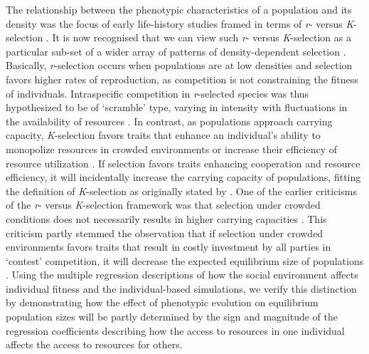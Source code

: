 \documentclass{article}
\begin{document}
The relationship between the phenotypic characteristics of a population and its density was the focus of early life-history studies framed in terms of \textit{r}- versus \textit{K}-selection \citep{macarthur1967theory}. It is now recognised that we can view such \textit{r}- versus \textit{K}-selection as a particular sub-set of a wider array of patterns of density-dependent selection \citep{Boyce1984, Wright2018, Engen2020}. Basically, \textit{r}-selection occurs when populations are at low densities and selection favors higher rates of reproduction, as competition is not constraining the fitness of individuals. Intraspecific competition in \textit{r}-selected species was thus hypothesized to be of 
`scramble' type, varying in intensity with fluctuations in the availability of resources \citep{Southwood1977}. In contrast, as populations approach carrying capacity, \textit{K}-selection favors traits that enhance an individual's ability to monopolize resources in crowded environments or increase their efficiency of resource utilization \citep{Boyce1984}. If selection favors traits enhancing cooperation and resource efficiency, it will incidentally increase the carrying capacity of populations, fitting the definition of \textit{K}-selection as originally stated by \cite{macarthur1967theory}. One of the earlier criticisms of the \textit{r}- versus \textit{K}-selection framework was that selection under crowded conditions does not necessarily results in higher carrying capacities \citep{Boyce1984}. This criticism partly stemmed the observation that if selection under crowded environments favors traits that result in costly investment by all parties in 
`contest' competition, it will decrease the expected equilibrium size of populations \citep{Joshi2001, Engen2020}. Using the multiple regression descriptions of how the social environment affects individual fitness and the individual-based simulations, we verify this distinction by demonstrating how the effect of phenotypic evolution on equilibrium population sizes will be partly determined by the sign and magnitude of the regression coefficients describing how the access to resources in one individual affects the access to resources for others.
\end{document}
